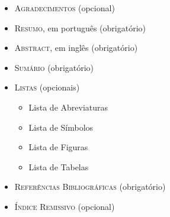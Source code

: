 \begin{itemize}
  \item \textsc{Agradecimentos} (opcional)

  \item \textsc{Resumo}, em português (obrigatório)

  \item \textsc{Abstract}, em inglês (obrigatório)

  \item \textsc{Sumário} (obrigatório)

  \item \textsc{Listas} (opcionais)
  \begin{itemize}
    \item Lista de Abreviaturas
    \item Lista de Símbolos
    \item Lista de Figuras
    \item Lista de Tabelas
  \end{itemize}

  \item \textsc{Referências Bibliográficas} (obrigatório)

  \item \textsc{Índice Remissivo} (opcional)
\end{itemize}
